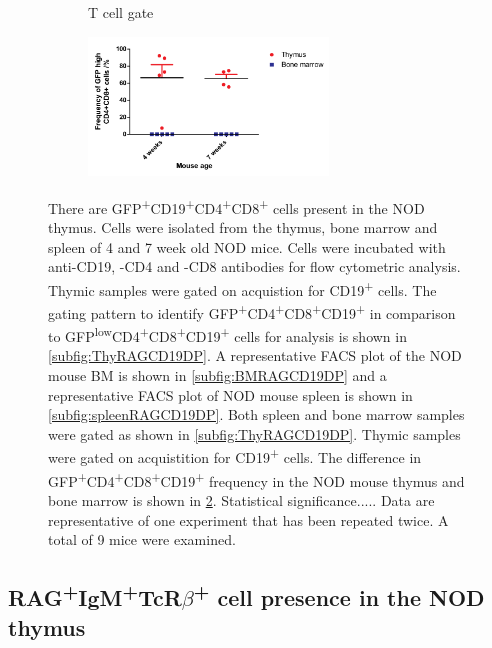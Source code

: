 \begin{figure}
\begin{subfigure}{0.3\textwidth}
	\caption{T cell gate}
	\label{subfig:Tcellgate}
	\end{subfigure}
	\begin{subfigure}{\textwidth}
	\centering
	\includegraphics[width=0.7\textwidth]{Figures/RAGCD19CD4CD8ThyBM.pdf}
	\caption{}
	\label{BMvThyDPgraph}
	\end{subfigure}
\caption[There are GFP\textsuperscript{+}CD19\textsuperscript{+}CD4\textsuperscript{+}CD8\textsuperscript{+} cells present in the NOD thymus] {There are GFP\textsuperscript{+}CD19\textsuperscript{+}CD4\textsuperscript{+}CD8\textsuperscript{+} cells present in the NOD thymus.
Cells were isolated from the thymus, bone marrow and spleen of 4 and 7 week old NOD mice.
Cells were incubated with anti-CD19, -CD4 and -CD8 antibodies for flow cytometric analysis.
Thymic samples were gated on acquistion for CD19\textsuperscript{+} cells.
The gating pattern to identify GFP\textsuperscript{+}CD4\textsuperscript{+}CD8\textsuperscript{+}CD19\textsuperscript{+} in comparison to GFP\textsuperscript{low}CD4\textsuperscript{+}CD8\textsuperscript{+}CD19\textsuperscript{+} cells for analysis is shown in \ref{subfig:ThyRAGCD19DP}.
A representative FACS plot of the NOD mouse BM is shown in \ref{subfig:BMRAGCD19DP} and a representative FACS plot of NOD mouse spleen is shown in \ref{subfig:spleenRAGCD19DP}. Both spleen and bone marrow samples were gated as shown in \ref{subfig:ThyRAGCD19DP}.
Thymic samples were gated on acquistition for CD19\textsuperscript{+} cells.
The difference in GFP\textsuperscript{+}CD4\textsuperscript{+}CD8\textsuperscript{+}CD19\textsuperscript{+} frequency in the NOD mouse thymus and bone marrow is shown in \ref{BMvThyDPgraph}. Statistical significance.....
Data are representative of one experiment that has been repeated twice. A total of 9 mice were examined.}
\label{fig:RAGCD19DP}
\end{figure}

\subsection{RAG\textsuperscript{+}IgM\textsuperscript{+}TcR$\beta$\textsuperscript{+} cell presence in the NOD thymus}


